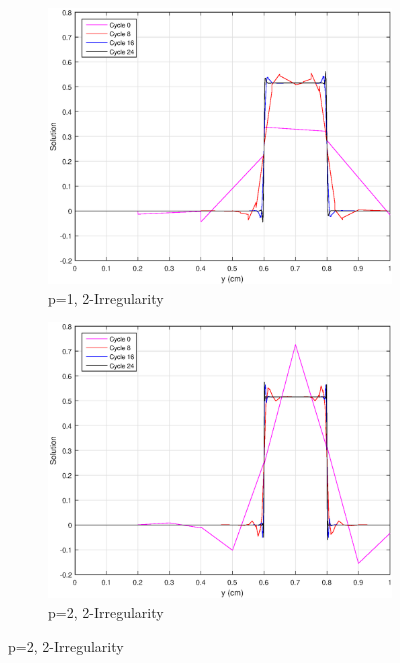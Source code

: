 \begin{figure}
{}
\vspace{2.5mm}
{
	\begin{subfigure}[b]{0.45\textwidth}
		\centering
		\label{subfig::SL_uniform_ef_pwl1_irr2}
		\includegraphics[width=\textwidth]{figures/sec_BF/SL_AMR_PWLD_k1_Irr2.eps}
		\caption{p=1, 2-Irregularity}
	\end{subfigure}
	\hfill
	\begin{subfigure}[b]{0.45\textwidth}
		\centering
		\label{subfig::SL_uniform_ef_pwl2_irr2}
		\includegraphics[width=\textwidth]{figures/sec_BF/SL_AMR_PWLD_k2_Irr2.eps}
		\caption{p=2, 2-Irregularity}
	\end{subfigure}
}
\end{figure}
